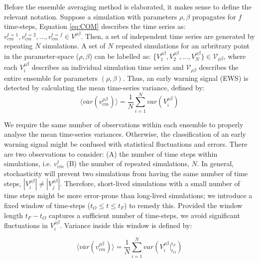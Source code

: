 Before the ensemble averaging method is elaborated, it makes sense to define the relevant notation.
Suppose a simulation with parameters $\rho, \beta$ propagates for $f$ time-steps, Equation \ref{eq:COM} describes the time series as: $v_{cm}^{t=1}, v_{cm}^{t=2},..., v_{cm}^{t=f} \in V^{\rho\beta}$. 
Then, a set of independent time series are generated by repeating $N$ simulations. 
A set of $N$ repeated simulations for an arbritrary point in the parameter-space ($\rho, \beta$) 
can be labelled as: \{$V_1^{\rho\beta}, V_2^{\rho \beta},..., V_N^{\rho\beta}\} \in \mathcal{V}_{\rho\beta}$, 
where each $V_i^{\rho\beta}$ describes an individual simulation time series and $\mathcal{V}_{\rho\beta}$ describes the entire ensemble for parameters $(\rho, \beta)$. 
Thus, an early warning signal (EWS) is detected by calculating the mean time-series variance,
defined by:
\begin{equation}
\label{eq:ews_eq}
    \big\langle \overline{var}(v^{\rho\beta}_{cm}) \big\rangle = \frac{1}{N}\sum\limits_{i=1}^{N} var(V_i^{\rho\beta})
\end{equation}

We require the same number of observations within each ensemble to properly analyse the mean time-series variances.
Otherwise, the classification of an early warning signal might be confused with statistical fluctuations and errors.
There are two observations to consider: 
(A) the number of time steps within simulations, i.e. $v_{cm}^{t}$ 
(B) the number of repeated simulations, $N$.
In general, stochasticity will prevent two simulations from having the same number of time steps, 
$|V_i^{\rho\beta}| \neq |V_j^{\rho\beta}|$.
Therefore, short-lived simulations with a small number of time steps might be more error-prone than long-lived simulations;
we introduce a fixed window of time-steps ($t_O\leq t \leq t_F$) to remedy this.
Provided the window length $t_F-t_O$ captures a sufficient number of time-steps, we avoid significant fluctuations in $V_i^{\rho\beta}$. 
Variance inside this window is defined by:

\begin{equation}
\label{eq:ews_eq1}
    \big\langle \overline{var}(v^{\rho\beta}_{cm}) \big\rangle = \frac{1}{N}\sum\limits_{i=1}^{N} var(V_i^{\rho\beta}\Big|^{t_F}_{t_O})
\end{equation}

